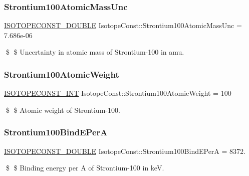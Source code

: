 \subsubsection{\texorpdfstring{Strontium100\+Atomic\+Mass\+Unc}{Strontium100AtomicMassUnc}}
{\footnotesize\ttfamily \mbox{\hyperlink{group___isotope_const-_macros_ga8f45a7272ce02c0b4c65c44636ed719a}{I\+S\+O\+T\+O\+P\+E\+C\+O\+N\+S\+T\+\_\+\+D\+O\+U\+B\+LE}} Isotope\+Const\+::\+Strontium100\+Atomic\+Mass\+Unc = 7.\+686e-\/06}

\$ \$ Uncertainty in atomic mass of Strontium-\/100 in amu. \mbox{\label{group___isotope_const-_strontium-_sr100_ga87d35f8a023a9bd6d578680cbec67e41}} 
\subsubsection{\texorpdfstring{Strontium100\+Atomic\+Weight}{Strontium100AtomicWeight}}
{\footnotesize\ttfamily \mbox{\hyperlink{group___isotope_const-_macros_ga5f18360b3e99483a35c32d789e62621c}{I\+S\+O\+T\+O\+P\+E\+C\+O\+N\+S\+T\+\_\+\+I\+NT}} Isotope\+Const\+::\+Strontium100\+Atomic\+Weight = 100}

\$ \$ Atomic weight of Strontium-\/100. \mbox{\label{group___isotope_const-_strontium-_sr100_ga9301c218a2dc9fdc303d7664ac49702c}} 
\subsubsection{\texorpdfstring{Strontium100\+Bind\+E\+PerA}{Strontium100BindEPerA}}
{\footnotesize\ttfamily \mbox{\hyperlink{group___isotope_const-_macros_ga8f45a7272ce02c0b4c65c44636ed719a}{I\+S\+O\+T\+O\+P\+E\+C\+O\+N\+S\+T\+\_\+\+D\+O\+U\+B\+LE}} Isotope\+Const\+::\+Strontium100\+Bind\+E\+PerA = 8372.}

\$ \$ Binding energy per A of Strontium-\/100 in keV. \mbox{\label{group___isotope_const-_strontium-_sr100_gafde252e1aa2f563ae45a9697f4b178e4}} 
